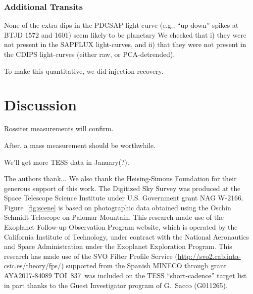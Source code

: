 \documentclass[12pt,twocolumn,tighten]{aastex62}
\newcommand{\tn}{TOI~837} %
\begin{document}
\subsubsection{Additional Transits}

None of the extra dips in the PDCSAP light-curve (e.g., ``up-down''
spikes at BTJD 1572 and 1601) seem likely to be planetary
We checked that i) they were not present in the SAPFLUX light-curves,
and ii) that they were not present in the CDIPS light-curves (either
raw, or PCA-detrended).

To make this quantitative, we did injection-recovery.



\section{Discussion}
\label{sec:discussion}

Rossiter measurements will confirm.

After, a mass measurement should be worthwhile.

We'll get more TESS data in January(?).





\acknowledgements
%
%
%
The authors thank...
%
We also thank the Heising-Simons Foundation for
their generous support of this work.
%
The Digitized Sky Survey was produced at the Space Telescope Science
Institute under U.S. Government grant NAG W-2166.
Figure~\ref{fig:scene} is based on photographic data obtained using
the Oschin Schmidt Telescope on Palomar Mountain.
%
This research made use of the Exoplanet Follow-up Observation
Program website, which is operated by the California Institute of
Technology, under contract with the National Aeronautics and Space
Administration under the Exoplanet Exploration Program.
%
This research has made use of the SVO Filter Profile Service
(\url{http://svo2.cab.inta-csic.es/theory/fps/}) supported from the Spanish
MINECO through grant AYA2017-84089
%
\tn\ was included on the TESS ``short-cadence'' target list in part
thanks to the Guest Investigator program of G.\ Sacco (G011265).
\end{document}
